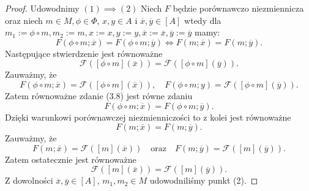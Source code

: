 \documentclass[12pt,a4paper]{report}
\newcommand{\domkniecie}[1]{\left[ {#1} \right] }
\begin{document}
\begin{proof}
Udowodnimy $(1) \implies (2)$
Niech $F$ będzie porównawczo niezmiennicza oraz niech $m\in M, \phi \in \Phi$, $x, y \in A$ i $\overline{x}, \overline{y} \in \domkniecie{A}$ wtedy dla $m_1:=\phi\circ m, m_2:=m, x:=x, y:=y, \overline{x}:=\overline{x}, \overline{y}:=\overline{y}$ mamy:
$$
F(\phi\circ m;\overline{x})=F(\phi\circ m;\overline{y}) \iff F(m;\overline{x})=F(m;\overline{y}).
$$
Następujące stwierdzenie jest równoważne
\begin{equation}
\mathcal{F}(\domkniecie{\phi \circ m}(\overline{x}))=\mathcal{F}(\domkniecie{\phi \circ m}(\overline{y})).
\end{equation}
Zauważmy, że
$$
F(\phi \circ m;\overline{x})=\mathcal{F}( \domkniecie{\phi \circ m}(\overline{x})), \quad F(\phi \circ m;y)=\mathcal{F}(\domkniecie{\phi\circ m}(\overline{y})).
$$
Zatem równoważne zdanie (3.8) jest równe zdaniu
$$
F(\phi\circ m;\overline{x})=F(\phi \circ m;\overline{y}).
$$
Dzięki warunkowi porównawczej niezmienniczości to z kolei jest równoważne
$$
F(m;\overline{x})=F(m;\overline{y}).
$$
Zauważmy, że 
$$
F(m;\overline{x})=\mathcal{F}(\domkniecie{m}(\overline{x})) \quad \textrm{oraz} \quad F(m;\overline{y})=\mathcal{F}(\domkniecie{m}(\overline{y})).
$$
Zatem ostatecznie jest równoważne 
$$
\mathcal{F}(\domkniecie{m}(\overline{x}))=\mathcal{F}(\domkniecie{m}(\overline{y})).
$$
Z dowolności $\overline{x}, \overline{y} \in \domkniecie{A}$, $m_1, m_2 \in M$ udowodniliśmy punkt (2).


\end{proof}
\end{document}
